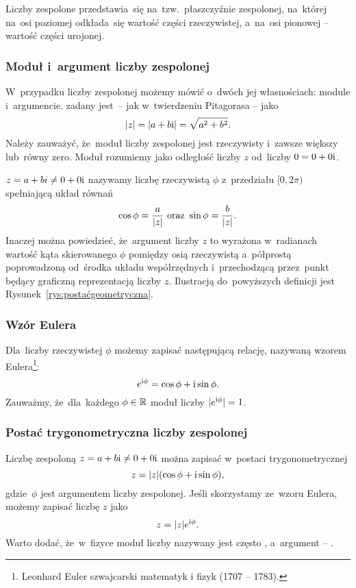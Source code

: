 Liczby zespolone przedstawia~się na~tzw.~płaszczyźnie zespolonej, na~której
na~osi poziomej odkłada~się wartość części rzeczywistej, a~na~osi pionowej -- wartość części urojonej.

\subsubsection{Moduł i~argument liczby zespolonej}
W~przypadku liczby zespolonej możemy mówić o~dwóch jej własnościach: module i~argumencie.
 zadany jest~-- jak
w~twierdzeniu Pitagorasa -- jako
$$
	\abs{z} = \abs{a+b{\mathrm i}} = \sqrt{a^2+b^2}.
$$
Należy zauważyć, że~moduł liczby zespolonej jest rzeczywisty i~zawsze większy lub~równy
zero. Moduł rozumiemy jako odległość liczby $z$ od~liczby $0=0+0{\mathrm i}$.

$z = a + bi \neq 0 + 0{\mathrm i}$ nazywamy liczbę rzeczywistą $\phi$ z~przedziału $[0,2\pi)$ spełniającą układ równań
$$
	\cos \phi = \frac{a}{\abs{z}}  \text{ oraz }   \sin \phi=\frac{b}{\abs{z}}.
$$
Inaczej można powiedzieć, że~argument liczby $z$ to wyrażona w~radianach wartość
kąta skierowanego $\phi$ pomiędzy osią rzeczywistą a~półprostą poprowadzoną od~środka układu
współrzędnych i~przechodzącą przez~punkt będący graficzną reprezentacją liczby $z$.
Ilustracją do~powyższych definicji jest Rysunek~\ref{rys:postaćgeometryczna}.

\subsubsection{Wzór Eulera}
Dla~liczby rzeczywistej $\phi$ możemy zapisać następującą relację, nazywaną wzorem Eulera\footnote{
	Leonhard Euler szwajcarski matematyk i fizyk (1707 -- 1783).}:
$$
	e^{{\mathrm i} \phi} = \cos\phi + {\mathrm i} \sin\phi.
$$
Zauważmy, że~dla~każdego $\phi\in \mathbb{R}$ moduł liczby $|e^{{\mathrm i} \phi}| = 1$.

\subsubsection{Postać trygonometryczna liczby zespolonej}
Liczbę zespoloną $z = a + b{\mathrm i} \neq 0 + 0{\mathrm i}$ można zapisać w~postaci trygonometrycznej
$$
	z = \abs{z}(\cos \phi + {\mathrm i} \sin \phi),
$$
gdzie~$\phi$ jest argumentem liczby zespolonej.
Jeśli skorzystamy ze~wzoru Eulera, możemy zapisać liczbę $z$ jako
$$
	z = \abs{z}e^{{\mathrm i} \phi}.
$$
Warto dodać, że~w~fizyce moduł liczby nazywany jest często ,
a~argument -- .

